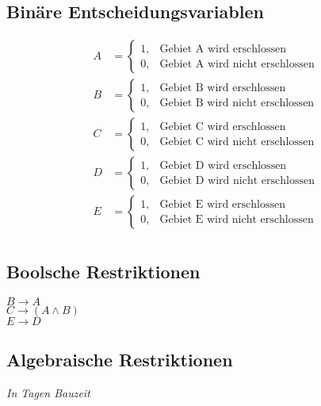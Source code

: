 \documentclass[a4paper,11pt]{article}
\begin{document}
\subsection*{Binäre Entscheidungsvariablen}
\begin{align*}
    A &= \begin{cases}
        1, & \text{Gebiet A wird erschlossen} \\
        0, & \text{Gebiet A wird nicht erschlossen}
    \end{cases} \\
    B &= \begin{cases}
        1, & \text{Gebiet B wird erschlossen} \\
        0, & \text{Gebiet B wird nicht erschlossen}
    \end{cases} \\
    C &= \begin{cases}
        1, & \text{Gebiet C wird erschlossen} \\
        0, & \text{Gebiet C wird nicht erschlossen}
    \end{cases} \\
    D &= \begin{cases}
        1, & \text{Gebiet D wird erschlossen} \\
        0, & \text{Gebiet D wird nicht erschlossen}
    \end{cases} \\
    E &= \begin{cases}
        1, & \text{Gebiet E wird erschlossen} \\
        0, & \text{Gebiet E wird nicht erschlossen}
    \end{cases} \\
\end{align*}


\pagebreak

\subsection*{Boolsche Restriktionen}
$B \to A$ \\
$C \to (A \land B)$ \\
$E \to D$ \\

\subsection*{Algebraische Restriktionen}
\textit{In Tagen Bauzeit} \newline
\end{document}
